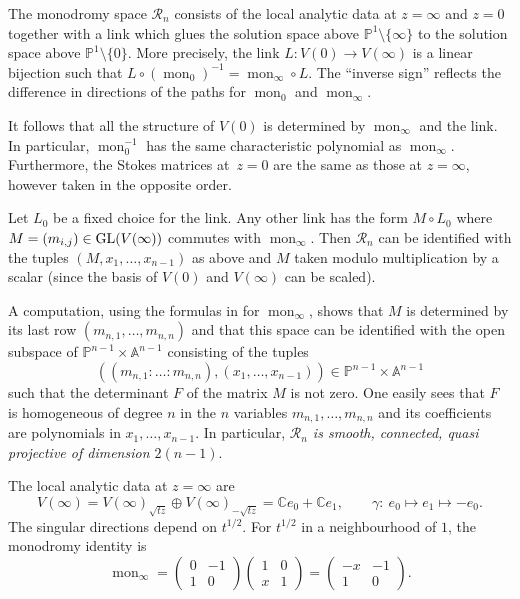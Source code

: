 \documentclass[10pt,a4paper]{amsart}
\numberwithin{equation}{section}
\begin{document}
The monodromy space $\mathcal{R}_n$ consists of the local analytic data at $z=\infty$ and $z=0$ together with
a link which glues the solution space above $\mathbb{P}^1\setminus \{\infty \}$ to the solution space
above $\mathbb{P}^1\setminus \{0\}$. More precisely, the link $L\colon V(0)\rightarrow V(\infty)$ is a linear bijection such that
$L\circ (\operatorname{mon}_0)^{-1}=\operatorname{mon}_\infty \circ L$. The ``inverse sign'' reflects the difference in directions of the paths for
$\operatorname{mon}_0$ and $\operatorname{mon}_\infty$.


 It follows that all the structure of $V(0)$ is determined by $\operatorname{mon}_\infty$ and the link. In particular, $\operatorname{mon}_0^{-1}$ has the same characteristic polynomial as $\operatorname{mon}_\infty$. Furthermore, the Stokes matrices at~${z=0}$ are the same as those at $z=\infty$, however taken in the opposite order.


Let $L_0$ be a fixed choice for the link. Any other link has the form $M\circ L_0$ where
$M=(m_{i,j})\in {\rm GL}(V(\infty))$ commutes with $\operatorname{mon}_\infty$. Then $\mathcal{R}_n$ can be identified with the tuples $(M,x_1,\dots ,x_{n-1})$ as above and $M$ taken modulo multiplication by a scalar (since the basis of $V(0)$ and $V(\infty)$ can be
 scaled).

A computation, using the formulas in \cite[Sections~3.3 and~3.4]{CM-vdP} for $\operatorname{mon}_\infty$, shows that $M$ is determined by its last
row $(m_{n,1},\dots ,m_{n,n})$ and that this space
can be identified with the open subspace of $\mathbb{P}^{n-1}\times \mathbb{A}^{n-1}$ consisting
of the tuples
\[((m_{n,1}:\dots :m_{n,n}),(x_1,\dots ,x_{n-1}))\in \mathbb{P}^{n-1}\times \mathbb{A}^{n-1}\]
 such that
the determinant $F$ of the matrix $M$ is not zero. One easily sees that $F$ is homogeneous of degree
$n$ in the $n$ variables $m_{n,1},\dots ,m_{n,n}$ and its coefficients are polynomials in $x_1,\dots ,x_{n-1}$.
In particular, {\it $\mathcal{R}_n$ is smooth, connected, quasi projective of dimension $2(n-1)$}.

\begin{Example} The local analytic data at $z=\infty$ are
\[
V(\infty)=V(\infty)_{\sqrt{tz}}\oplus V(\infty)_{-\sqrt{tz}}=\mathbb{C}e_0+\mathbb{C}e_1,\qquad
\gamma \colon\ e_0\mapsto e_1 \mapsto -e_0.
\]
The singular directions depend on $t^{1/2}$. For $t^{1/2}$ in a neighbourhood
of $1$, the monodromy identity is
\[\operatorname{mon}_\infty= \left(\begin{matrix}0 & -1\\ 1 & 0\end{matrix}\right)\left(\begin{matrix}1&0\\ x & 1\end{matrix}\right) =
\left(\begin{matrix}-x &-1\\ 1 & 0\end{matrix}\right).
\]
\end{Example}
\end{document}
